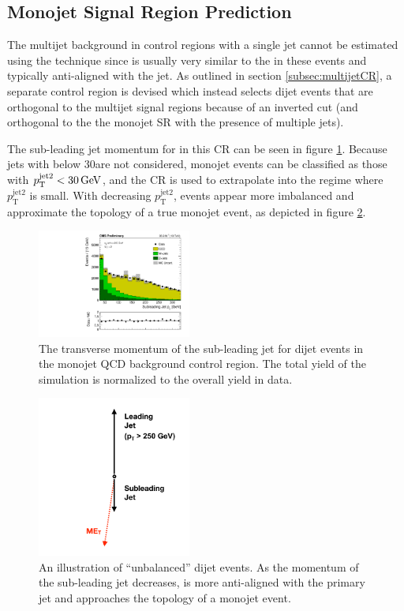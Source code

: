 \subsection{Monojet Signal Region Prediction}
\label{subsec:qcdMonojet}
The multijet background in control regions with a single jet cannot be estimated using the \dphi technique since \MET is usually very similar to the \HT in these events and typically anti-aligned with the jet. As outlined in section \ref{subsec:multijetCR}, a separate control region is devised which instead selects dijet events that are orthogonal to the multijet signal regions because of an inverted \dphilong cut (and orthogonal to the the monojet SR with the presence of multiple jets). 

The sub-leading jet momentum for in this CR can be seen in figure \ref{fig:subleadingJetPt}. Because jets with \pt below 30\GeV are not considered, monojet events can be classified as those with $p_{\mathrm{T}}^{\mathrm{jet2}} < 30\,\text{Ge\hspace{-.08em}V}$, and the CR is used to extrapolate into the regime where $p_{\mathrm{T}}^{\mathrm{jet2}}$ is small. With decreasing $p_{\mathrm{T}}^{\mathrm{jet2}}$, events appear more imbalanced and approximate the topology of a true monojet event, as depicted in figure \ref{fig:monojetCartoon}.
\begin{figure}
	\centering
	\includegraphics[width=0.45\textwidth]{backgrounds/figs/jet2_pt_35p9ifb}
	\caption{The transverse momentum of the sub-leading jet for dijet events in the monojet QCD background control region. The total yield of the simulation is normalized to the overall yield in data.}
	\label{fig:subleadingJetPt}
\end{figure}
\begin{figure}
	\centering
	\includegraphics[width=0.45\textwidth]{backgrounds/figs/dijet_cartoon_Moriond2017}
	\caption{An illustration of ``unbalanced'' dijet events. As the momentum of the sub-leading jet decreases, \MET is more anti-aligned with the primary jet and approaches the topology of a monojet event.}
	\label{fig:monojetCartoon}
\end{figure}

